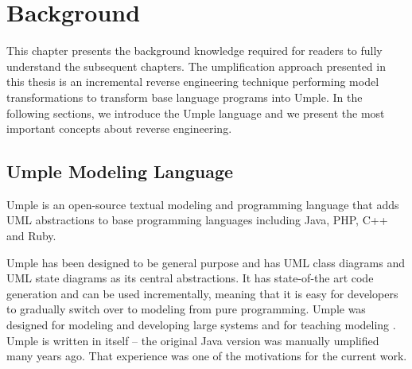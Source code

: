 \lhead{\emph{\leftmark}}  
\chapter{Background}
\label{chap:background}

This chapter presents the background knowledge required for readers to fully understand the subsequent chapters. The umplification approach presented in this thesis is an incremental reverse engineering technique performing model transformations to transform base language programs into Umple. In the following sections, we introduce the Umple language and we present the most important concepts about reverse engineering. 

\section{Umple Modeling Language}

Umple \cite{UmpleMAIN} is an open-source textual modeling and programming language that adds UML abstractions to base programming languages including Java, PHP, C++ and Ruby.

Umple has been designed to be general purpose and has UML class diagrams and UML state diagrams as its central abstractions. It has state-of-the art code generation and can be used incrementally, meaning that it is easy for developers to gradually switch over to modeling from pure programming. Umple was designed for modeling and developing large systems and for teaching modeling \cite{teachingUmple}. Umple is written in itself -- the original Java version was manually umplified many years ago. That experience was one of the motivations for the current work.

